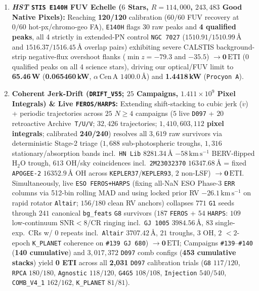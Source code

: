 \documentclass[twocolumn,10pt]{article}
\begin{document}
\begin{enumerate}
  \item \textbf{\textit{HST} \texttt{STIS E140H} FUV Echelle ($6$ Stars, $R = 114{,}000$, $243{,}483$ Good Native Pixels):} Reaching \textbf{120/120} calibration ($60/60$ FUV recovery at $0/60$ hot-px/chromo-geo FA), \texttt{E140H} flags $30$ raw peaks and \textbf{4 qualified peaks}, all 4 strictly in extended-PN control \texttt{NGC\,7027} ($1510.91/1510.99\,\text{\AA}$ and $1516.37/1516.45\,\text{\AA}$ overlap pairs) exhibiting severe CALSTIS background-strip negative-flux overshoot flanks ($\min z = -79.3$ and $-35.5$) $\rightarrow \mathbf{0\,\mathrm{ETI}}$ ($0$ qualified peaks on all 4 science stars), driving our optical/FUV limit to \textbf{65.46\,W} (\textbf{0.065460\,kW}, $\alpha$\,Cen\,A $1400.0\,\text{\AA}$) and \textbf{1.4418\,kW} (\texttt{Procyon\,A}).
  \item \textbf{Coherent Jerk-Drift (\texttt{DRIFT\_V55}; $25$ Campaigns, $1.411\times 10^9$ Pixel Integrals) \& Live \texttt{FEROS/HARPS}:} Extending shift-stacking to cubic jerk ($\dddot{v}$) + periodic trajectories across $25$ $N\ge 4$ campaigns ($5$ live \texttt{D097} + $20$ retroactive Archive~\texttt{T/U/V}; $32{,}426$ trajectories; \textbf{$1{,}410{,}603{,}112$ pixel integrals}; calibrated \textbf{240/240}) resolves all $3{,}619$ raw survivors via deterministic Stage-2 triage ($1{,}688$ sub-photospheric troughs, $1{,}316$ stationary/absorption bands incl.\ \texttt{HN\,Lib} $8281.34\,\text{\AA}$ $-58\,\mathrm{km\,s^{-1}}$ BERV-flipped $\mathrm{H_2O}$ trough, $613$ OH/sky coincidences incl.\ \texttt{2M23032370} $16347.68\,\text{\AA}$ = fixed \texttt{APOGEE-2} $16352.9\,\text{\AA}$ OH across \texttt{KEPLER37}/\texttt{KEPLER93}, $2$ non-LSF) $\rightarrow \mathbf{0\,\mathrm{ETI}}$. Simultaneously, live \texttt{ESO FEROS+HARPS} (fixing all-NaN ESO Phase-3 \texttt{ERR} columns via 512-bin rolling MAD and using locked prior RV $-26.1\,\mathrm{km\,s^{-1}}$ on rapid rotator \texttt{Altair}; $156/180$ clean RV anchors) collapses $771$ \texttt{G1} seeds through $241$ canonical \texttt{bg\_feats} \texttt{G8} survivors ($187$ \texttt{FEROS} + $54$ \texttt{HARPS}: $109$ low-continuum $\mathrm{SNR}<8$/CR ringing incl.\ \texttt{GJ\,1005} $3984.56\,\text{\AA}$, $83$ single-exp.\ CRs w/ $0$ repeats incl.\ \texttt{Altair} $3707.42\,\text{\AA}$, $21$ troughs, $3$ OH, $2$ $<2$-epoch \texttt{K\_PLANET} coherence on \texttt{\#139 GJ\,680}) $\rightarrow \mathbf{0\,\mathrm{ETI}}$; Campaigns \texttt{\#139}--\texttt{\#140} (\textbf{140 cumulative}) and $3{,}017{,}372$ \texttt{D097} comb configs (\textbf{453 cumulative stacks}) yield \textbf{0 ETI} across all \textbf{2,031} \texttt{D097} calibration trials (\texttt{G8} $117/120$, \texttt{RPCA} $180/180$, \texttt{Agnostic} $118/120$, \texttt{G4G5} $108/108$, \texttt{Injection} $540/540$, \texttt{COMB\_V4\_1} $162/162$, \texttt{K\_PLANET} $81/81$).
\end{enumerate}
\end{document}
